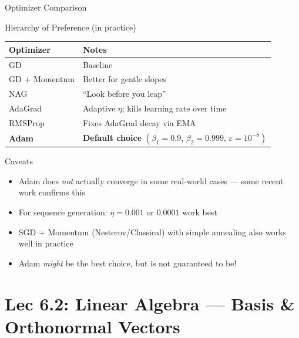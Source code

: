 \documentclass{beamer}
\begin{document}
\begin{frame}[shrink=10]{Optimizer Comparison}
  \begin{block}{Hierarchy of Preference (in practice)}
    \centering
    \renewcommand{\arraystretch}{1.35}
    \begin{tabular}{ll}
      \toprule
      \textbf{Optimizer} & \textbf{Notes}\\
      \midrule
      GD                 & Baseline\\
      GD + Momentum      & Better for gentle slopes\\
      NAG                & ``Look before you leap''\\
      AdaGrad            & Adaptive $\eta$; kills learning rate over time\\
      RMSProp            & Fixes AdaGrad decay via EMA\\
      \textbf{Adam}      & \textbf{Default choice}
                           $(\beta_1{=}0.9,\,\beta_2{=}0.999,\,
                           \varepsilon{=}10^{-8})$\\
      \bottomrule
    \end{tabular}
  \end{block}

  \medskip

  \begin{alertblock}{Caveats}
    \begin{itemize}\setlength\itemsep{5pt}
      \item Adam does \emph{not} actually converge in some real-world
            cases --- some recent work confirms this
      \item For sequence generation: $\eta = 0.001$ or $0.0001$
            work best
      \item SGD + Momentum (Nesterov/Classical) with simple annealing
            also works well in practice
      \item Adam \emph{might} be the best choice, but is not
            guaranteed to be!
    \end{itemize}
  \end{alertblock}
\end{frame}

\section{Lec 6.2: Linear Algebra --- Basis \& Orthonormal Vectors}
\end{document}
